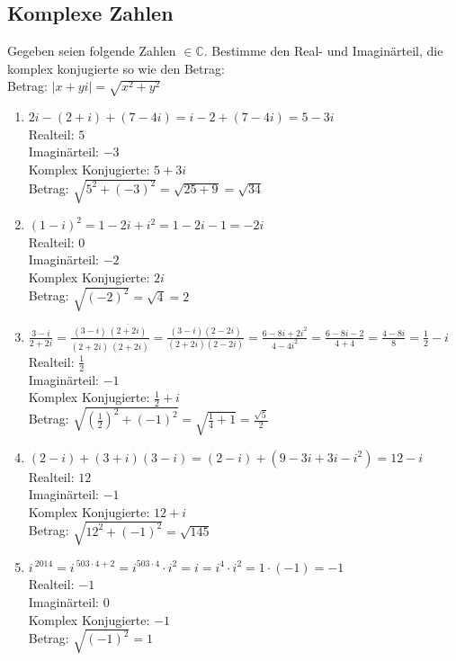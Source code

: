 \documentclass[11pt, a4paper]{article}
\newcommand{\abs}[1]{\left\lvert#1\right\rvert}
\begin{document}
\subsection{Komplexe Zahlen}
Gegeben seien folgende Zahlen $\in \mathbb{C}$. Bestimme den Real- und Imaginärteil, die komplex konjugierte so wie den Betrag: \\
Betrag: $\abs{x+yi} = \sqrt{x^2+y^2}$
\begin{enumerate}
	\item $2i - (2 + i) + (7 - 4i) = i-2 + (7-4i) = 5-3i$ \\
	Realteil: $5$ \\
	Imaginärteil: $-3$ \\
	Komplex Konjugierte: $5+3i$ \\
	Betrag: $\sqrt{5^2 + (-3)^2} = \sqrt{25+9} = \sqrt{34}$
	\item $(1-i)^2 = 1-2i+i^2 = 1-2i-1 = -2i$ \\
	Realteil: $0$ \\
	Imaginärteil: $-2$ \\
	Komplex Konjugierte: $2i$ \\
	Betrag: $\sqrt{(-2)^2} = \sqrt{4} = 2$
	\item $\frac{3-i}{2+2i} = \frac{(3-i) \ \overline{(2+2i)}}{(2+2i) \ \overline{(2+2i)}} = \frac{(3-i)(2-2i)}{(2+2i)(2-2i)} = \frac{6-8i+2i^2}{4-4i^2} = \frac{6-8i-2}{4+4} = \frac{4-8i}{8} = \frac{1}{2}-i$ \\
	Realteil: $\frac{1}{2}$ \\
	Imaginärteil: $-1$ \\
	Komplex Konjugierte: $\frac{1}{2}+i$ \\
	Betrag: $\sqrt{\left(\frac{1}{2}\right)^2+(-1)^2} = \sqrt{\frac{1}{4}+1} = \frac{\sqrt{5}}{2}$
	\item $(2-i) + (3+i)(3-i) = (2-i) + (9-3i+3i-i^2) = 12-i$ \\
	Realteil: $12$ \\
	Imaginärteil: $-1$ \\
	Komplex Konjugierte: $12+i$ \\
	Betrag: $\sqrt{12^2 + (-1)^2} = \sqrt{145}$
	\item $i^{\ 2014} = i^{\ 503 \cdot 4 + 2} = i^{503 \cdot 4} \cdot i^2 = i = i^4 \cdot i^2 = 1 \cdot (-1) = -1$ \\
	Realteil: $-1$ \\
	Imaginärteil: $0$ \\
	Komplex Konjugierte: $-1$ \\
	Betrag: $\sqrt{(-1)^2} = 1$
\end{enumerate}
\end{document}
